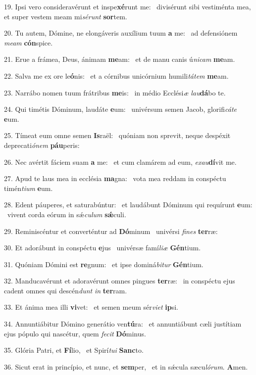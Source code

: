 19. Ipsi vero consideravérunt et inspe\textbf{xé}runt me: \ast\  divisérunt sibi vestiménta mea, et super vestem meam mi\textit{sé}\textit{runt} \textbf{sor}tem.\

20. Tu autem, Dómine, ne elongáveris auxílium tuum \textbf{a} me: \ast\  ad defensiónem \textit{me}\textit{am} \textbf{cón}spice.\

21. Erue a frámea, Deus, ánimam \textbf{me}am: \ast\  et de manu canis ú\textit{ni}\textit{cam} \textbf{me}am.\

22. Salva me ex ore le\textbf{ó}nis: \ast\  et a córnibus unicórnium humili\textit{tá}\textit{tem} \textbf{me}am.\

23. Narrábo nomen tuum frátribus \textbf{me}is: \ast\  in médio Ecclési\textit{æ} \textit{lau}\textbf{dá}bo te.\

24. Qui timétis Dóminum, laudáte \textbf{e}um: \ast\  univérsum semen Jacob, glorifi\textit{cá}\textit{te} \textbf{e}um.\

25. Tímeat eum omne semen \textbf{Is}raël: \ast\  quóniam non sprevit, neque despéxit deprecati\textit{ó}\textit{nem} \textbf{páu}peris:\

26. Nec avértit fáciem suam \textbf{a} me: \ast\  et cum clamárem ad eum, \textit{ex}\textit{au}\textbf{dí}vit me.\

27. Apud te laus mea in ecclésia \textbf{ma}gna: \ast\  vota mea reddam in conspéctu timén\textit{ti}\textit{um} \textbf{e}um.\

28. Edent páuperes, et saturabúntur: \dag\  et laudábunt Dóminum qui requírunt \textbf{e}um: \ast\  vivent corda eórum in sǽ\textit{cu}\textit{lum} \textbf{sǽ}culi.\

29. Reminiscéntur et converténtur ad \textbf{Dó}minum \ast\  univérsi \textit{fi}\textit{nes} \textbf{ter}ræ:\

30. Et adorábunt in conspéctu \textbf{e}jus \ast\  univérsæ famí\textit{li}\textit{æ} \textbf{Gén}tium.\

31. Quóniam Dómini est \textbf{re}gnum: \ast\  et ipse dominá\textit{bi}\textit{tur} \textbf{Gén}tium.\

32. Manducavérunt et adoravérunt omnes pingues \textbf{ter}ræ: \ast\  in conspéctu ejus cadent omnes qui descén\textit{dunt} \textit{in} \textbf{ter}ram.\

33. Et ánima mea illi \textbf{vi}vet: \ast\  et semen meum sér\textit{vi}\textit{et} \textbf{ip}si.\

34. Annuntiábitur Dómino generátio ven\textbf{tú}ra: \ast\  et annuntiábunt cæli justítiam ejus pópulo qui nascétur, quem \textit{fe}\textit{cit} \textbf{Dó}minus.\

35. Glória Patri, et \textbf{Fí}lio, \ast\  et Spirí\textit{tu}\textit{i} \textbf{Sanc}to.\

36. Sicut erat in princípio, et nunc, et \textbf{sem}per, \ast\  et in sǽcula sæcu\textit{ló}\textit{rum}. \textbf{A}men.\

